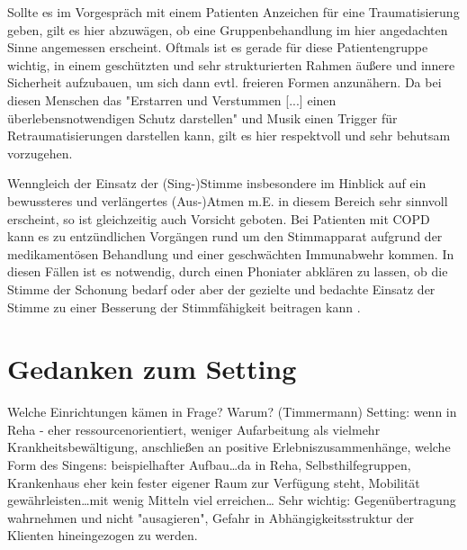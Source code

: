 Sollte es im Vorgespräch mit einem Patienten Anzeichen für eine Traumatisierung geben, gilt es hier abzuwägen, ob eine Gruppenbehandlung im hier angedachten Sinne angemessen erscheint. Oftmals ist es gerade für diese Patientengruppe wichtig, in einem geschützten und sehr strukturierten Rahmen äußere und innere Sicherheit aufzubauen, um sich dann evtl. freieren Formen anzunähern. Da bei diesen Menschen das "Erstarren und Verstummen [...] einen überlebensnotwendigen Schutz darstellen" \autocite[68]{rittner2012} und Musik einen Trigger für Retraumatisierungen darstellen kann, gilt es hier respektvoll und sehr behutsam vorzugehen.

Wenngleich der Einsatz der (Sing-)Stimme insbesondere im Hinblick auf ein bewussteres und verlängertes (Aus-)Atmen m.E. in diesem Bereich sehr sinnvoll erscheint, so ist gleichzeitig auch Vorsicht geboten. Bei Patienten mit COPD kann es zu entzündlichen Vorgängen rund um den Stimmapparat aufgrund der medikamentösen Behandlung und einer geschwächten Immunabwehr kommen. In diesen Fällen ist es notwendig, durch einen Phoniater abklären zu lassen, ob die Stimme der Schonung bedarf oder aber der gezielte und bedachte Einsatz der Stimme zu einer Besserung der Stimmfähigkeit beitragen kann \autocite[vgl.][103ff.]{alavi2009}.

\section{Gedanken zum Setting}
\label{section:gedanken_zum_setting}
Welche Einrichtungen kämen in Frage? Warum? 
(Timmermann) Setting: wenn in Reha - eher ressourcenorientiert, weniger Aufarbeitung als vielmehr Krankheitsbewältigung, anschließen an positive Erlebniszusammenhänge, welche Form des Singens: beispielhafter Aufbau\ldots da in Reha, Selbsthilfegruppen, Krankenhaus eher kein fester eigener Raum zur Verfügung steht, Mobilität gewährleisten\ldots mit wenig Mitteln viel erreichen…
Sehr wichtig: Gegenübertragung wahrnehmen und nicht "ausagieren", Gefahr in Abhängigkeitsstruktur der Klienten hineingezogen zu werden.

